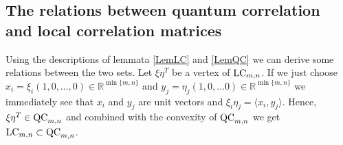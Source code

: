 \subsection{The relations between quantum correlation and local correlation matrices}

Using the descriptions of lemmata \ref{LemLC} and \ref{LemQC} we can derive some relations between the two sets. 
Let $ \xi\eta^T $ be a vertex of $ \textup{LC}_{m,n} $. If we just choose $ x_i = \xi_i (1,0,\hdots,0) \in \mathbb{R}^{\min \{m,n\}}$ and $ y_j = \eta_j(1,0,\hdots 0) \in \mathbb{R}^{\min \{m,n \}}$ we immediately see that $ x_i $ and $ y_j $ are unit vectors and $ \xi_i\eta_j = \langle x_i, y_j \rangle $. Hence, $ \xi\eta^T \in \textup{QC}_{m,n} $ and combined with the convexity of $ \textup{QC}_{m,n} $ we get $ \textup{LC}_{m,n} \subset \textup{QC}_{m,n} $.


